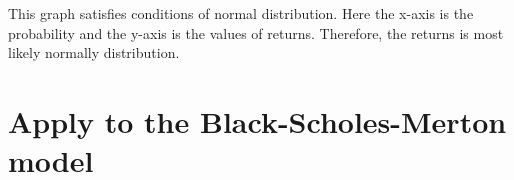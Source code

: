 This graph satisfies conditions of normal distribution. Here the x-axis is the probability and the y-axis is the values of returns.
Therefore, the returns is most likely normally distribution.
\section{Apply to the Black-Scholes-Merton model}







